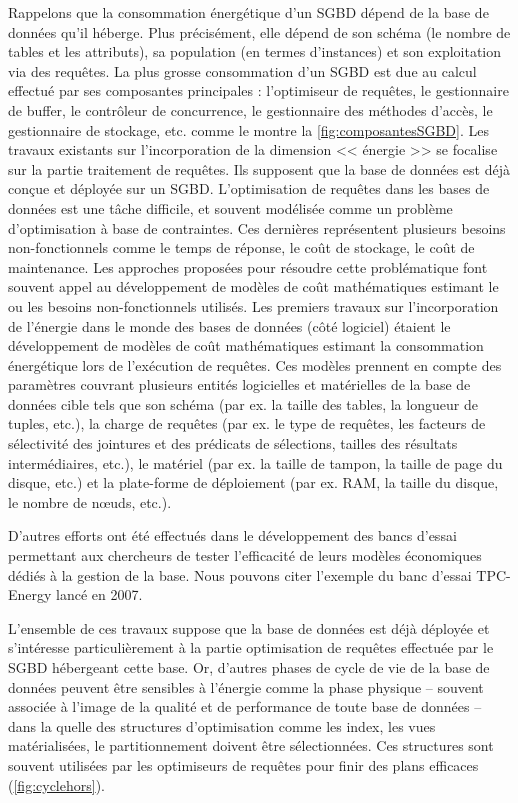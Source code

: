 Rappelons que la consommation énergétique d'un SGBD dépend de la base de données qu'il héberge. Plus précisément, elle dépend de son schéma (le nombre de tables et les attributs), sa population (en termes d'instances) et son exploitation via des requêtes. La plus grosse consommation d'un SGBD est due au calcul effectué par ses composantes principales : l'optimiseur de requêtes, le gestionnaire de buffer, le contrôleur de concurrence, le gestionnaire des méthodes d'accès, le gestionnaire de stockage, etc. comme le montre la \ref{fig:composantesSGBD}. Les travaux existants sur l'incorporation de la dimension << énergie >> se focalise sur la partie traitement de requêtes. Ils supposent que la base de données est déjà conçue et déployée sur un SGBD. L'optimisation de requêtes dans les bases de données est une tâche difficile, et souvent modélisée comme un problème d'optimisation à base de contraintes. Ces dernières représentent plusieurs besoins non-fonctionnels comme le temps de réponse, le coût de stockage, le coût de maintenance. Les approches proposées pour résoudre cette problématique font souvent appel au développement de modèles de coût mathématiques estimant le ou les besoins non-fonctionnels utilisés. Les premiers travaux sur l'incorporation de l'énergie dans le monde des bases de données (côté logiciel) étaient le développement de modèles de coût mathématiques estimant la consommation énergétique lors de l'exécution de requêtes. Ces modèles prennent en compte des paramètres couvrant plusieurs entités logicielles et matérielles de la base de données cible tels que son schéma (par ex. la taille des tables, la longueur de tuples, etc.), la charge de requêtes (par ex. le type de requêtes, les facteurs de sélectivité des jointures et des prédicats de sélections, tailles des résultats intermédiaires, etc.), le matériel (par ex. la taille de tampon, la taille de page du disque, etc.) et la plate-forme de déploiement (par ex. RAM, la taille du disque, le nombre de nœuds, etc.).

D'autres efforts ont été effectués dans le développement des bancs d'essai permettant aux chercheurs de tester l'efficacité de leurs modèles économiques dédiés à la gestion de la base. Nous pouvons citer l'exemple du banc d'essai TPC-Energy \cite{TPCE} lancé en 2007. 

L'ensemble de ces travaux suppose que la base de données est déjà déployée et s'intéresse particulièrement à la partie optimisation de requêtes effectuée par le SGBD hébergeant cette base. Or, d'autres phases de cycle de vie de la base de données peuvent être sensibles à l'énergie comme la phase physique -- souvent associée à l'image de la qualité et de performance de toute base de données -- dans la quelle des structures d'optimisation comme les index, les vues matérialisées, le partitionnement doivent être sélectionnées. Ces structures sont souvent utilisées par les optimiseurs de requêtes pour finir des plans efficaces (\ref{fig:cyclehors}).

